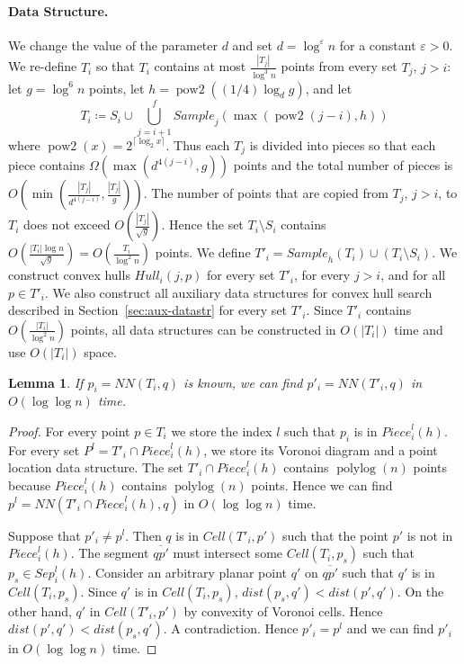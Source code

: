 \documentclass[10pt,a4paper]{amsart}
\newcommand{\ov}[1]{\overline{#1}}
\newcommand{\Cell}{\mathit{Cell}}
\newcommand{\Sample}{\mathit{Sample}}
\newcommand{\Piece}{\mathit{Piece}}
\newcommand{\Sep}{\mathit{Sep}}
\newcommand{\Hull}{\mathit{Hull}}
\newcommand{\NN}{\mathit{NN}}
\newcommand{\eps}{\varepsilon}
\newcommand{\john}[1]{\textcolor{red}{#1}}
\newtheorem{lemma}{Lemma}
\begin{document}
\paragraph*{Data Structure.}
We change the value of the parameter $d$ and set $d=\log^{\eps} n$ for a constant $\eps>0$. We re-define $T_i$ so that $T_i$ contains at most $\frac{|T_j|}{\log^3 n}$ points from every  set $T_j$, $j>i$: %
let  $g=\log^6 n$ points, let $h=\operatorname{pow2}((1/4)\log_d g)$, and let $$ T_i \coloneqq S_i \cup \bigcup_{j=i+1}^{f} \Sample_j(\max(\operatorname{pow2}(j-i),h))$$ where $\operatorname{pow2}(x)=2^{\lceil\log_2 x\rceil}$. Thus each $T_j$ is divided into  pieces so that each piece contains $\Omega(\max(d^{4(j-i)},g))$ points and the total number of pieces is  $O(\min(\frac{|T_j|}{d^{4(j-i)}},\frac{|T_j|}{g}))$. The number of points  that are copied from $T_j$, $j>i$,  to $T_i$ does not exceed  $O(\frac{|T_j|}{\sqrt{g}})$. Hence the set  $T_i\setminus S_i$ contains $O(\frac{|T_i|\log n}{\sqrt{g}})=O(\frac{T_i}{\log^2 n})$ points. 
We define $T'_i= \Sample_h(T_i)\cup (T_i\setminus S_i)$. We construct convex hulls $\Hull_i(j,p)$ for every set $T'_i$, for every $j>i$, and for all $p\in T'_i$. We also construct all auxiliary data  structures for convex hull search described in Section~\ref{sec:aux-datastr} for every set $T'_i$. Since $T'_i$ contains $O(\frac{|T_i|}{\log^2n})$ points, all data structures can be constructed in $O(|T_i|)$ time and use $O(|T_i|)$ space. %

\begin{lemma}
  \label{lemma:tprime}
  If $p_i=\NN(T_i,q)$ is known, we can find $p'_i=\NN(T'_i,q)$ in $O(\log \log n)$ time. 
\end{lemma}
\begin{proof}
  For every point $p\in T_i$ we store the index $l$ such that $p_i$ is in $ \Piece^l_i(h)$. For every set
  $P^l=T'_i\cap \Piece^l_i(h)$, we store its Voronoi diagram and a point location data structure. The set $T'_i\cap \Piece^l_i(h)$ contains $\operatorname{polylog}(n)$ points because $\Piece^l_i(h)$ contains $\operatorname{polylog}(n)$ points. Hence we can find  $p^l=\NN(T'_i\cap \Piece^l_i(h),q)$ in $O(\log\log n)$ time. 

  Suppose that $p'_i\not=p^l$. Then $q$ is in $\Cell(T'_i,p')$ such that the point $p'$ is not in $\Piece^l_i(h)$. The segment $\ov{qp'}$ must intersect some $\Cell(T_i,p_s)$ such that $p_s\in \Sep^{l}_i(h)$. Consider an arbitrary planar point $q'$ on  $\ov{qp'}$ such that $q'$ is in $\Cell(T_i,p_s)$. Since $q'$ is in $\Cell(T_i,p_s)$,  $dist(p_s,q')< dist(p',q')$. On the other hand, $q'$ in $\Cell(T'_i,p')$ by convexity of Voronoi cells. Hence   $dist(p',q')< dist(p_s,q')$. A contradiction. 
Hence $p'_i=p^l$ and we can find $p'_i$  in $O(\log\log n)$ time. 
\end{proof}
\end{document}
